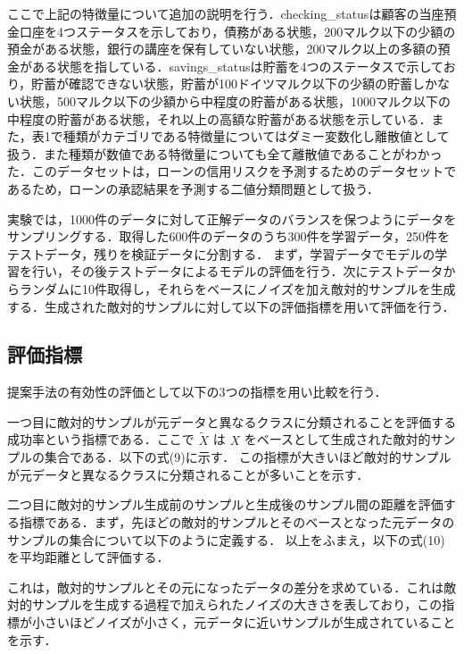 ここで上記の特徴量について追加の説明を行う．checking\_statusは顧客の当座預金口座を4つステータスを示しており，債務がある状態，200マルク以下の少額の預金がある状態，銀行の講座を保有していない状態，200マルク以上の多額の預金がある状態を指している．savings\_statusは貯蓄を4つのステータスで示しており，貯蓄が確認できない状態，貯蓄が100ドイツマルク以下の少額の貯蓄しかない状態，500マルク以下の少額から中程度の貯蓄がある状態，1000マルク以下の中程度の貯蓄がある状態，それ以上の高額な貯蓄がある状態を示している．また，表1で種類がカテゴリである特徴量についてはダミー変数化し離散値として扱う．また種類が数値である特徴量についても全て離散値であることがわかった．このデータセットは，ローンの信用リスクを予測するためのデータセットであるため，ローンの承認結果を予測する二値分類問題として扱う．

実験では，1000件のデータに対して正解データのバランスを保つようにデータをサンプリングする．取得した600件のデータのうち300件を学習データ，250件をテストデータ，残りを検証データに分割する．
まず，学習データでモデルの学習を行い，その後テストデータによるモデルの評価を行う．次にテストデータからランダムに10件取得し，それらをベースにノイズを加え敵対的サンプルを生成する．生成された敵対的サンプルに対して以下の評価指標を用いて評価を行う．

\subsection{評価指標}
提案手法の有効性の評価として以下の3つの指標を用い比較を行う．

一つ目に敵対的サンプルが元データと異なるクラスに分類されることを評価する成功率という指標である．ここで $\tilde{X}$ は $X$ をベースとして生成された敵対的サンプルの集合である．以下の式(9)に示す．
この指標が大きいほど敵対的サンプルが元データと異なるクラスに分類されることが多いことを示す．

二つ目に敵対的サンプル生成前のサンプルと生成後のサンプル間の距離を評価する指標である．まず，先ほどの敵対的サンプルとそのベースとなった元データのサンプルの集合について以下のように定義する．
以上をふまえ，以下の式(10)を平均距離として評価する．

これは，敵対的サンプルとその元になったデータの差分を求めている．これは敵対的サンプルを生成する過程で加えられたノイズの大きさを表しており，この指標が小さいほどノイズが小さく，元データに近いサンプルが生成されていることを示す．

